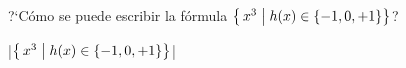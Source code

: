 

\bigskip

\enunciadoS ?`C\'omo se puede escribir la f\'ormula $\bigl\{\,x^3 \bigm\vert h(x) \in \{-1,0,+1\} \bigr\}$?

\bigskip

\respuestaS

|$\bigl\{\,x^3 \bigm\vert h(x) \in \{-1,0,+1\} \bigr\}$|

\bye

